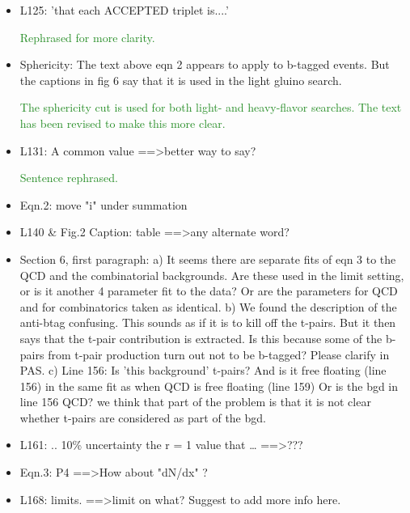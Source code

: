 \documentclass[paper=a4, fontsize=11pt]{scrartcl}
\begin{document}
\begin{itemize}
\item L125: 'that each ACCEPTED triplet is....' 

\textcolor{ForestGreen}{Rephrased for more clarity.}\\

\item Sphericity: 
The text above eqn 2 appears to apply to b-tagged events. But the captions 
in fig 6 say that it is used in the light gluino search. 

\textcolor{ForestGreen}{The sphericity cut is used for both light- and heavy-flavor searches.
The text has been revised to make this more clear.}\\

\item L131: 
A common value ==\textgreater better way to say? 

\textcolor{ForestGreen}{Sentence rephrased.}\\

\item Eqn.2: 
move "i" under summation 


\item L140 \& Fig.2 Caption: 
table ==\textgreater any alternate word? 


\item Section 6, first paragraph: 
a) It seems there are separate fits of eqn 3 to the QCD and the combinatorial 
backgrounds. Are these used in the limit setting, or is it another 4 
parameter fit to the data? Or are the parameters for QCD and for 
combinatorics taken as identical. 
b) We found the description of the anti-btag confusing. This sounds as if it 
is to kill off the t-pairs. But it then says that the t-pair contribution is 
extracted. Is this because some of the b-pairs from t-pair production turn 
out not to be b-tagged? Please clarify in PAS. 
c) Line 156: Is 'this background' t-pairs? And is it free floating (line 156) 
in the same fit as when QCD is free floating (line 159) {Or is the bgd in 
line 156 QCD?} 
{we think that part of the problem is that it is not clear whether t-pairs 
are considered as part of the bgd.} 


\item L161: 
.. 10\% uncertainty the r = 1 value that … ==\textgreater ??? 


\item Eqn.3: 
P4 ==\textgreater How about "dN/dx" ? 


\item L168: 
limits. ==\textgreater limit on what? Suggest to add more info here. 



\end{itemize}
\end{document}
